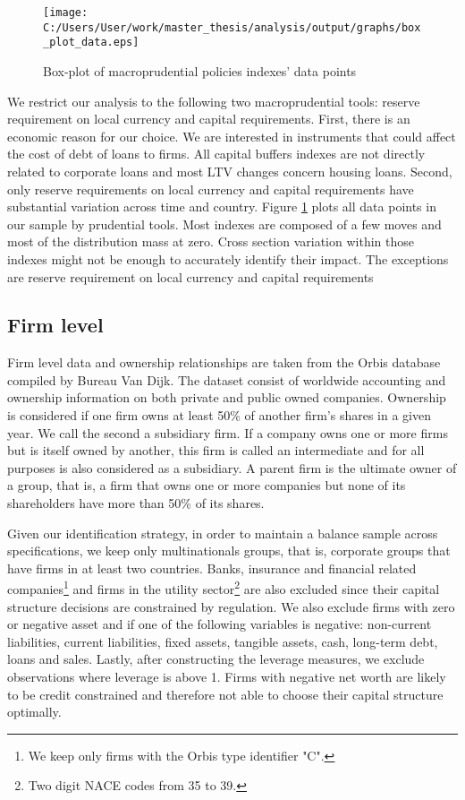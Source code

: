 \documentclass[12pt]{article}
\begin{document}
	  \begin{figure}[h!]
	  	\centering
	  	\caption{Box-plot of macroprudential policies indexes' data points}
	  	\texttt{[image: C:/Users/User/work/master\_thesis/analysis/output/graphs/box\_plot\_data.eps]}
	  	\label{fig:boxplot data}
	  \end{figure}
  
	  We restrict our analysis to the following two macroprudential tools: reserve requirement on local currency and  capital requirements. First, there is an economic reason for our choice. We are interested in instruments that could affect the cost of debt of loans to firms. All capital buffers indexes are not directly related to corporate loans and most LTV changes concern housing loans. Second, only reserve requirements on local currency and capital requirements have substantial variation across time and country. Figure \ref{fig:boxplot data} plots all data points in our sample by prudential tools. Most indexes are composed of a few moves and most of the distribution mass at zero. Cross section variation within those indexes might not be enough to accurately identify their impact. The exceptions are reserve requirement on local currency and capital requirements 
	  	
 	\subsection{Firm level} \label{subsec:firm}
	Firm level data and ownership relationships are taken from the Orbis database compiled by Bureau Van Dijk.	The dataset consist of worldwide accounting and ownership information on both private and public owned companies. Ownership is considered if one firm owns at least 50\% of another firm's shares in a given year. We call the second a subsidiary firm. If a company owns one or more firms but is itself owned by another, this firm is called an intermediate and for all purposes is also considered as a subsidiary. A parent firm is the ultimate owner of a group, that is, a firm that owns one or more companies but none of its shareholders have more than 50\% of its shares.
	
	Given our identification strategy, in order to maintain a balance sample across specifications, we keep only multinationals groups, that is, corporate groups that have firms in at least two countries.  Banks, insurance and financial related companies\footnote{We keep only firms with the Orbis type identifier "C".} and firms in the utility sector\footnote{Two digit NACE codes from 35 to 39.} are also excluded since their capital structure decisions are constrained by regulation. We also exclude firms with zero or negative asset and if one of the following variables is negative: non-current liabilities, current liabilities, fixed assets, tangible assets, cash, long-term debt, loans and sales. Lastly, after constructing the leverage measures, we exclude observations where leverage is above 1. Firms with negative net worth are likely to be credit constrained and therefore not able to choose their capital structure optimally. 
	
\end{document}
